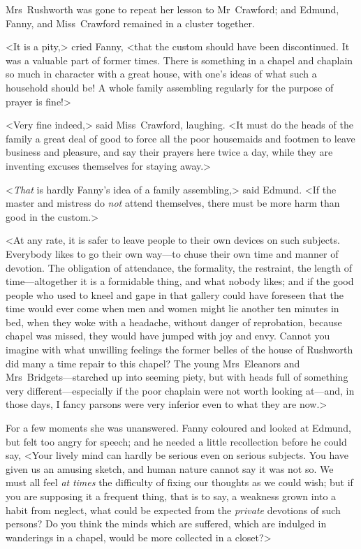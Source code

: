 Mrs~Rushworth was gone to repeat her lesson to Mr~Crawford; and Edmund, Fanny, and Miss~Crawford remained in a cluster together.

<It is a pity,> cried Fanny, <that the custom should have been discontinued. It was a valuable part of former times. There is something in a chapel and chaplain so much in character with a great house, with one's ideas of what such a household should be! A whole family assembling regularly for the purpose of prayer is fine!>

<Very fine indeed,> said Miss~Crawford, laughing. <It must do the heads of the family a great deal of good to force all the poor housemaids and footmen to leave business and pleasure, and say their prayers here twice a day, while they are inventing excuses themselves for staying away.>

<\textit{That}  is hardly Fanny's idea of a family assembling,> said Edmund. <If the master and mistress do \textit{not}  attend themselves, there must be more harm than good in the custom.>

<At any rate, it is safer to leave people to their own devices on such subjects. Everybody likes to go their own way—to chuse their own time and manner of devotion. The obligation of attendance, the formality, the restraint, the length of time—altogether it is a formidable thing, and what nobody likes; and if the good people who used to kneel and gape in that gallery could have foreseen that the time would ever come when men and women might lie another ten minutes in bed, when they woke with a headache, without danger of reprobation, because chapel was missed, they would have jumped with joy and envy. Cannot you imagine with what unwilling feelings the former belles of the house of Rushworth did many a time repair to this chapel? The young Mrs~Eleanors and Mrs~Bridgets—starched up into seeming piety, but with heads full of something very different—especially if the poor chaplain were not worth looking at—and, in those days, I fancy parsons were very inferior even to what they are now.>

For a few moments she was unanswered. Fanny coloured and looked at Edmund, but felt too angry for speech; and he needed a little recollection before he could say, <Your lively mind can hardly be serious even on serious subjects. You have given us an amusing sketch, and human nature cannot say it was not so. We must all feel \textit{at}  \textit{times}  the difficulty of fixing our thoughts as we could wish; but if you are supposing it a frequent thing, that is to say, a weakness grown into a habit from neglect, what could be expected from the \textit{private}  devotions of such persons? Do you think the minds which are suffered, which are indulged in wanderings in a chapel, would be more collected in a closet?>

